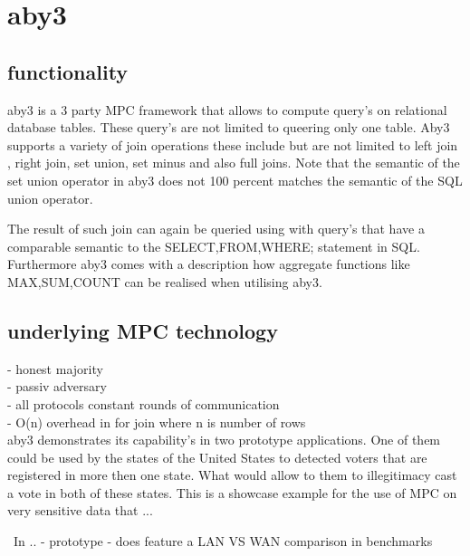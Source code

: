 \section{aby3}


\subsection{functionality }
aby3 is a 3 party MPC framework that allows to compute query's on relational database tables. These query's are not limited to queering only one table. Aby3 supports a variety of join operations these include but are not limited to  left join , right join, set union, set minus and also full joins. Note that the semantic of the set union operator in aby3 does not 100 percent matches the semantic of the SQL union operator. 

The result of such join can again be queried using with query's that have a comparable semantic to the SELECT,FROM,WHERE; statement in SQL. Furthermore aby3 comes with a description how aggregate functions like MAX,SUM,COUNT can be realised when utilising aby3.

\subsection{underlying MPC technology}
- honest majority \\ 
- passiv adversary \\
- all protocols constant rounds of communication \\
- O(n) overhead in for join where n is number of rows \\


aby3 demonstrates its capability's in two prototype applications. One of them could be used by the states of the United States to detected voters that are registered in more then one state. What would allow to them to illegitimacy cast a vote in both of these states. This is a showcase example for the use of MPC on very sensitive data that ...




\
In \cite{10.1145/3372297.3423358} ..
-  prototype 
- does feature a LAN VS WAN comparison in benchmarks

  